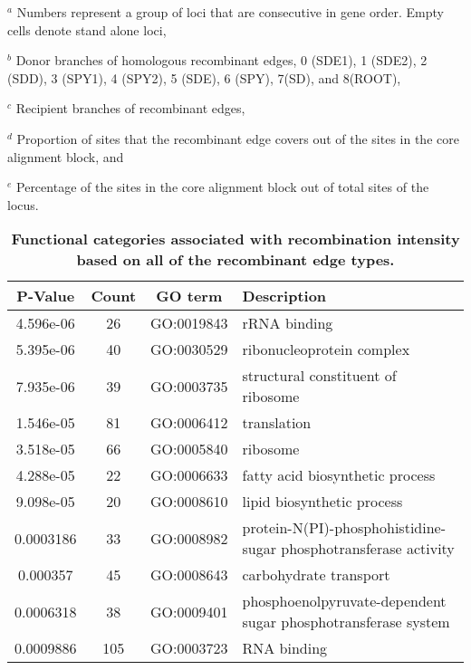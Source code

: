 \documentclass[10pt]{article}
\providecommand{\tabularnewline}{\\}
\begin{document}
\begin{table}[!ht]
{\begin{flushleft}
$^a$ Numbers represent a group of loci that are consecutive in gene order. Empty
cells denote stand alone loci,

$^b$ Donor branches of homologous recombinant edges, 0 (SDE1), 1 (SDE2), 2
(SDD), 3 (SPY1), 4 (SPY2), 5 (SDE), 6 (SPY), 7(SD), and 8(ROOT),

$^c$ Recipient branches of recombinant edges,

$^d$ Proportion of sites that the recombinant edge covers out of the sites in
the core alignment block, and

$^e$ Percentage of the sites in the core alignment block out of total sites of
the locus.
\end{flushleft}
}
\label{tab:genes-transfer}
\end{table}
\clearpage{}


\begin{table}[!ht]
\caption{
{\bf Functional categories associated with 
recombination intensity based on all of the recombinant edge types.}}
\noindent \begin{centering}
\begin{tabular}{cccl}
\hline 
P-Value & Count & GO term & Description\tabularnewline
\hline 
4.596e-06 & 26 & GO:0019843 & rRNA binding\tabularnewline
5.395e-06 & 40 & GO:0030529 & ribonucleoprotein complex\tabularnewline
7.935e-06 & 39 & GO:0003735 & structural constituent of ribosome\tabularnewline
1.546e-05 & 81 & GO:0006412 & translation\tabularnewline
3.518e-05 & 66 & GO:0005840 & ribosome\tabularnewline
4.288e-05 & 22 & GO:0006633 & fatty acid biosynthetic process\tabularnewline
9.098e-05 & 20 & GO:0008610 & lipid biosynthetic process\tabularnewline
0.0003186 & 33 & GO:0008982 & protein-N(PI)-phosphohistidine-sugar phosphotransferase activity\tabularnewline
0.000357 & 45 & GO:0008643 & carbohydrate transport\tabularnewline
0.0006318 & 38 & GO:0009401 & phosphoenolpyruvate-dependent sugar phosphotransferase system\tabularnewline
0.0009886 & 105 & GO:0003723 & RNA binding\tabularnewline
\hline 
\end{tabular}
\par\end{centering}
\label{tab:functional-all}
\end{table}
\end{document}
